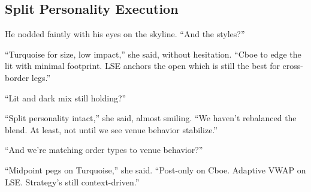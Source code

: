 
\subsection{Split Personality Execution}

He nodded faintly with his eyes on the skyline. ``And the styles?''


``Turquoise for size, low impact,'' she said, without hesitation. ``Cboe to edge the lit with minimal footprint. 
LSE anchors the open which is still the best for cross-border legs.''

``Lit and dark mix still holding?''

``Split personality intact,'' she said, almost smiling. ``We haven’t rebalanced the blend. At least, not 
until we see venue behavior stabilize.''

``And we’re matching order types to venue behavior?''

``Midpoint pegs on Turquoise,'' she said. ``Post-only on Cboe. Adaptive VWAP on LSE. Strategy’s still 
context-driven.''

\medskip

